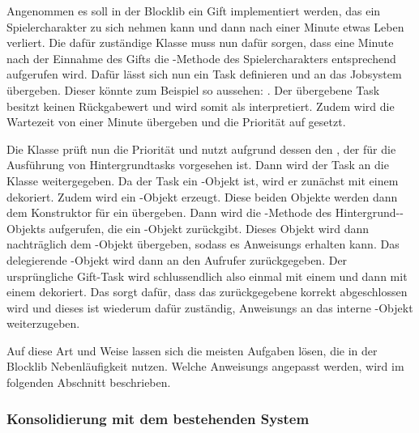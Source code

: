 \begin{example}
	Angenommen es soll in der Blocklib ein Gift implementiert werden, das ein Spielercharakter zu sich nehmen kann und dann nach einer Minute etwas Leben verliert. Die dafür zuständige Klasse muss nun dafür sorgen, dass eine Minute nach der Einnahme des Gifts die -Methode des Spielercharakters entsprechend aufgerufen wird. Dafür lässt sich nun ein Task definieren und an das Jobsystem übergeben. Dieser könnte zum Beispiel so aussehen: . Der übergebene Task besitzt keinen Rückgabewert und wird somit als \classRunnable{} interpretiert. Zudem wird die Wartezeit von einer Minute übergeben und die Priorität auf  gesetzt.

	Die Klasse \classBlocklibExecutor{} prüft nun die Priorität und nutzt aufgrund dessen den \classExecutorService{}, der für die Ausführung von Hintergrundtasks vorgesehen ist. Dann wird der Task an die Klasse \classCompletableFutureWrapper{} weitergegeben. Da der Task ein \classRunnable{}-Objekt ist, wird er zunächst mit einem \classRunnableCallable{} dekoriert. Zudem wird ein \classDelegatingScheduledCompletableFuture{}-Objekt erzeugt. Diese beiden Objekte werden dann dem Konstruktor für ein \classCompletingCallable{} übergeben. Dann wird die -Methode des Hintergrund-\classScheduledThreadPoolExecutor{}-Objekts aufgerufen, die ein \classFuture{}-Objekt zurückgibt. Dieses Objekt wird dann nachträglich dem \classDelegatingScheduledCompletableFuture{}-Objekt übergeben, sodass es \glspl{Anweisung} erhalten kann. Das delegierende \classCompletableFuture{}-Objekt wird dann an den Aufrufer zurückgegeben. Der ursprüngliche Gift-Task wird schlussendlich also einmal mit einem \classRunnableCallable{} und dann mit einem \classCompletingCallable{} dekoriert. Das \classCompletingCallable{} sorgt dafür, dass das zurückgegebene \classCompletableFuture{} korrekt abgeschlossen wird und dieses ist wiederum dafür zuständig, \glspl{Anweisung} an das interne \classFuture{}-Objekt weiterzugeben.
\end{example}

Auf diese Art und Weise lassen sich die meisten Aufgaben lösen, die in der Blocklib Nebenläufigkeit nutzen. Welche \glspl{Anweisung} angepasst werden, wird im folgenden Abschnitt beschrieben.

\subsubsection{Konsolidierung mit dem bestehenden System}\label{sec:Konsolidierung}

